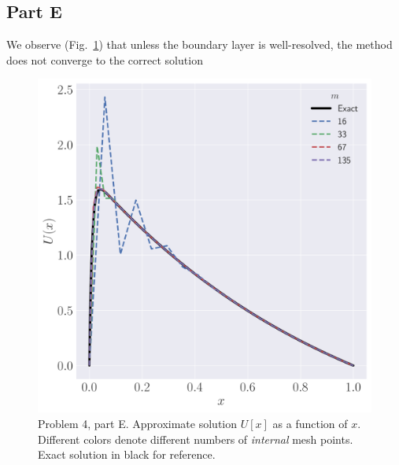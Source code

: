 \documentclass[12pt]{article}
\begin{document}
\subsection*{Part E}

We observe (Fig.~\ref{fig:p4e}) that unless the boundary layer is well-resolved, the method does not converge to the correct solution

\begin{figure}[!h]
	\centering
	\includegraphics[clip, scale=0.30]{q4e_fig.pdf}
	\caption{
		Problem 4, part E. Approximate solution $U[x]$ as a function of $x$. Different colors denote different numbers of \emph{internal} mesh points. Exact solution in black for reference.
	}
	\label{fig:p4e}
\end{figure}
\end{document}
